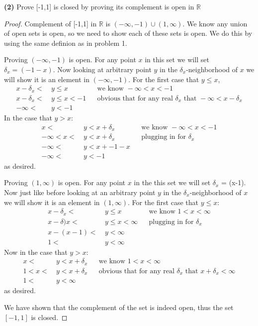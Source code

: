 \documentclass[12pt]{article}
\newcommand      {\Rm}         {{\mathbb R}}
\begin{document}
\noindent \textbf{ (2)} Prove [-1,1] is closed by proving its complement is open in $\Rm$
\begin{proof}
    Complement of [-1,1] in $\Rm$ is $(-\infty, -1)\cup (1,\infty)$. We know any union of open sets is open, so we need to show each of these sets is open. We do this by using the same definion as in problem 1. 

    Proving $(-\infty, -1)$ is open. For any point $x$ in this set we will set $\delta_x = (-1 - x)$. Now looking at arbitrary point $y$ in the $\delta_x$-neighborhood of $x$ we will show it is an element in $(-\infty, -1)$. For the first case that $y \leq x$,
    \begin{align*}
        x - \delta_x <\ &y \leq x && \text{we know } -\infty < x < -1 \\
        x - \delta_x <\ &y \leq x < -1 && \text{obvious that for any real $\delta_x$ that }-\infty < x - \delta_x \\
        -\infty <\ &y < -1
    \end{align*}
\newpage
    In the case that $y > x$:
    \begin{align*}
        x <\ &y < x + \delta_x && \text{we know } -\infty < x < -1 \\
        -\infty < x <\ &y < x + \delta_x && \text{plugging in for $\delta_x$} \\
        -\infty <\ &y < x + - 1 -x \\
        -\infty <\ &y < -1
    \end{align*}
    as desired.

    Proving $(1, \infty)$ is open. For any point $x$ in the this set we will set $\delta_x$ = (x-1). Now just like before looking at an arbitrary point $y$ in the $\delta_x$-neighborhood of $x$ we will show it is an element in $(1, \infty)$. For the first case that $y \leq x$:
    \begin{align*}
        x - \delta_x <\ &y \leq x && \text{we know $1 < x < \infty$} \\
        x - \delta)x <\ &y \leq x < \infty && \text{plugging in for $\delta_x$} \\
        x - (x-1) <\ &y < \infty \\
        1 <\ &y < \infty 
    \end{align*}
    Now in the case that $y > x$:
    \begin{align*}
        x <\ &y < x + \delta_x && \text{we know $1 < x < \infty$} \\
        1 < x <\ &y < x + \delta_x && \text{obvious that for any real $\delta_x$ that $x + \delta_x < \infty$} \\
        1 <\ &y < \infty 
    \end{align*}
    as desired.

    We have shown that the complement of the set is indeed open, thus the set $[-1,1]$ is closed. 
\end{proof}
\end{document}
